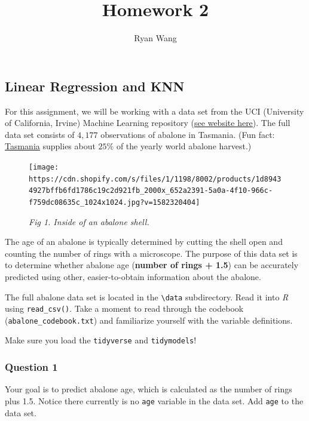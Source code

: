 \documentclass[
]{article}
\title{Homework 2}
\author{Ryan Wang}
\date{}
\begin{document}
\maketitle

{
\setcounter{tocdepth}{2}
\tableofcontents
}
\hypertarget{linear-regression-and-knn}{%
\subsection{Linear Regression and KNN}\label{linear-regression-and-knn}}

For this assignment, we will be working with a data set from the UCI
(University of California, Irvine) Machine Learning repository
(\href{http://archive.ics.uci.edu/ml/datasets/Abalone}{see website
here}). The full data set consists of \(4,177\) observations of abalone
in Tasmania. (Fun fact:
\href{https://en.wikipedia.org/wiki/Tasmania}{Tasmania} supplies about
\(25\%\) of the yearly world abalone harvest.)

\begin{figure}
\centering
\texttt{[image: https://cdn.shopify.com/s/files/1/1198/8002/products/1d89434927bffb6fd1786c19c2d921fb\_2000x\_652a2391-5a0a-4f10-966c-f759dc08635c\_1024x1024.jpg?v=1582320404]}
\caption{\emph{Fig 1. Inside of an abalone shell.}}
\end{figure}

The age of an abalone is typically determined by cutting the shell open
and counting the number of rings with a microscope. The purpose of this
data set is to determine whether abalone age (\textbf{number of rings +
1.5}) can be accurately predicted using other, easier-to-obtain
information about the abalone.

The full abalone data set is located in the
\texttt{\textbackslash{}data} subdirectory. Read it into \emph{R} using
\texttt{read\_csv()}. Take a moment to read through the codebook
(\texttt{abalone\_codebook.txt}) and familiarize yourself with the
variable definitions.

Make sure you load the \texttt{tidyverse} and \texttt{tidymodels}!

\hypertarget{question-1}{%
\subsubsection{Question 1}\label{question-1}}

Your goal is to predict abalone age, which is calculated as the number
of rings plus 1.5. Notice there currently is no \texttt{age} variable in
the data set. Add \texttt{age} to the data set.
\end{document}
